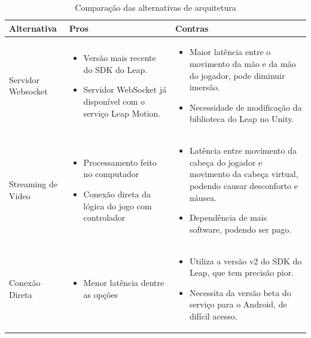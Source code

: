 \begin{table}[!h] \scriptsize
	\centering
	\begin{tabular}{|m{2.1cm}|>{\centering\arraybackslash}m{6cm}|>{\centering\arraybackslash}m{6cm}|}
		\hline 
		\textbf{Alternativa} & \textbf{Pros} & \textbf{Contras} \\
		\hline 
		Servidor Websocket
		&\begin{itemize}[label={--},noitemsep,topsep=0pt,leftmargin=4mm]
			\item Versão mais recente do SDK do Leap.
			\item Servidor WebSocket já disponível com o serviço Leap Motion.
		\end{itemize}
		&\begin{itemize}[label={--},noitemsep,topsep=1pt,leftmargin=4mm]
			\item Maior latência entre o movimento da mão e da mão do jogador, pode diminuir imersão.
			\item Necessidade de modificação da biblioteca do Leap no Unity.
		\end{itemize}
		\\ \hline 
		Streaming de Video
		&\begin{itemize}[label={--},noitemsep,topsep=0pt,leftmargin=4mm]
			\item Processamento feito no computador
			\item Conexão direta da lógica do jogo com controlador
		\end{itemize}
		&\begin{itemize}[label={--},noitemsep,topsep=0pt,leftmargin=4mm]
			\item Latência entre movimento da cabeça do jogador e movimento da cabeça virtual, podendo causar desconforto e náusea.
			\item Dependência de mais software, podendo ser pago.
		\end{itemize}
	    \\ \hline 
		Conexão Direta
		&\begin{itemize}[label={--},noitemsep,topsep=0pt,leftmargin=4mm]
				\item Menor latência dentre as opções
			\end{itemize}
		&\begin{itemize}[label={--},noitemsep,topsep=0pt,leftmargin=4mm]
				\item Utiliza a versão v2 do SDK do Leap, que tem precisão pior.
				\item Necessita da versão beta do serviço para o Android, de difícil acesso.
			\end{itemize}
		\\ 
		\hline 
	\end{tabular} 
	\caption[Comparação das alternativas de arquitetura]{Comparação das alternativas de arquitetura}
\label{tabela:alternativas-arquiteturas}
\end{table}

